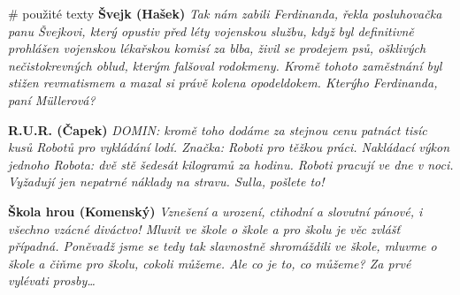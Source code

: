 \documentclass[
  czech,
  11pt,
  letterpaper,
  DIV=11,
  numbers=noendperiod]{scrreprt}
\begin{document}
\begin{tcolorbox}[enhanced jigsaw, arc=.35mm, bottomrule=.15mm, bottomtitle=1mm, breakable, colback=white, colbacktitle=quarto-callout-note-color!10!white, colframe=quarto-callout-note-color-frame, coltitle=black, left=2mm, leftrule=.75mm, opacityback=0, opacitybacktitle=0.6, rightrule=.15mm, title=\textcolor{quarto-callout-note-color}{\faInfo}\hspace{0.5em}{Poznámka}, titlerule=0mm, toprule=.15mm, toptitle=1mm]

\# použité texty \textbf{Švejk (Hašek)} \emph{Tak nám zabili Ferdinanda,
řekla posluhovačka panu Švejkovi, který opustiv před léty vojenskou
službu, když byl definitivně prohlášen vojenskou lékařskou komisí za
blba, živil se prodejem psů, ošklivých nečistokrevných oblud, kterým
falšoval rodokmeny. Kromě tohoto zaměstnání byl stižen revmatismem a
mazal si právě kolena opodeldokem. Kterýho Ferdinanda, paní Müllerová?}

\textbf{R.U.R. (Čapek)} \emph{DOMIN: kromě toho dodáme za stejnou cenu
patnáct tisíc kusů Robotů pro vykládání lodí. Značka: Roboti pro těžkou
práci. Nakládací výkon jednoho Robota: dvě stě šedesát kilogramů za
hodinu. Roboti pracují ve dne v noci. Vyžadují jen nepatrné náklady na
stravu. Sulla, pošlete to!}

\textbf{Škola hrou (Komenský)} \emph{Vznešení a urození, ctihodní a
slovutní pánové, i všechno vzácné diváctvo! Mluvit ve škole o škole a
pro školu je věc zvlášť případná. Poněvadž jsme se tedy tak slavnostně
shromáždili ve škole, mluvme o škole a čiňme pro školu, cokoli můžeme.
Ale co je to, co můžeme? Za prvé vylévati prosby\ldots{}}

\end{tcolorbox}
\end{document}
